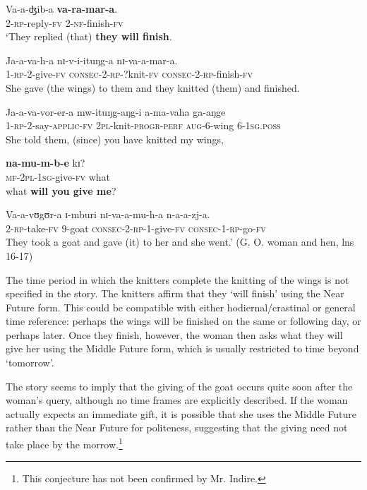 \documentclass[output=paper]{langsci/langscibook}
\begin{document}
\ea\label{ex:sarvasy:13}
\gll Va-a-ʤib-a   \textbf{va-ra-mar-a}. \\
2\textsc{-rp}-reply-\textsc{fv}  2-\textsc{nf-}finish-\textsc{fv} \\
\glt ‘They replied (that) \textbf{they will finish}.

\gll Ja-a-va-h-a     nɪ-v-i-ituŋg-a     nɪ-va-a-mar-a. \\
1\textsc{-rp-2}-give-\textsc{fv}    \textsc{consec-2-rp}-?knit-\textsc{fv}  \textsc{consec-2-rp-}finish-\textsc{fv} \\
\glt She gave (the wings) to them and they knitted (them) and finished.

\gll Ja-a-va-vor-er-a     mw-ituŋg-aŋg-i   a-ma-vaha   ga-aŋge \\
1-\textsc{rp-}2-say-\textsc{applic-fv}    \textsc{2pl-}knit-\textsc{progr-perf}  \textsc{aug-}6-wing  6-\textsc{1sg.poss} \\
\glt She told them, (since) you have knitted my wings, 

\gll \textbf{na-mu-m-b-e}       kɪ?  \\
\textsc{mf-2pl-1sg-}give-\textsc{fv}    what \\
\glt what \textbf{will you give me}?

\gll Va-a-vʊgʊr-a    ɪ-mburi  nɪ-va-a-mu-h-a    n-a-a-zj-a. \\
2\textsc{-rp}-take-\textsc{fv}    9-goat    \textsc{consec-2-rp}-1-give-\textsc{fv}  \textsc{consec-1-rp-}go-\textsc{fv} \\
\glt They took a goat and gave (it) to her and she went.’ (G. O. woman and hen, lns 16-17)
\z

The time period in which the knitters complete the knitting of the wings is not specified in the story. The knitters affirm that they ‘will finish’ using the Near Future form. This could be compatible with either hodiernal/crastinal or general time reference: perhaps the wings will be finished on the same or following day, or perhaps later. Once they finish, however, the woman then asks what they will give her using the Middle Future form, which is usually restricted to time beyond ‘tomorrow’. 

The story seems to imply that the giving of the goat occurs quite soon after the woman’s query, although no time frames are explicitly described. If the woman actually expects an immediate gift, it is possible that she uses the Middle Future rather than the Near Future for politeness, suggesting that the giving need not take place by the morrow.\footnote{This conjecture has not been confirmed by Mr. Indire.}
\end{document}
